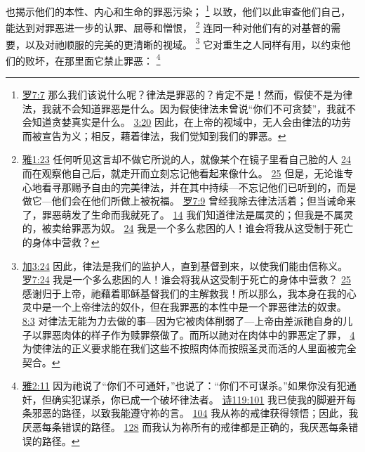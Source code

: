 \documentclass[12pt, a4paper, oneside]{ctexart}
\begin{document}
	也揭示他们的本性、内心和生命的罪恶污染；
	\footnote {
		\href{https://biblehub.com/romans/7-7.htm}{罗7:7} 那么我们该说什么呢？律法是罪恶的？肯定不是！然而，假使不是为律法，我就不会知道罪恶是什么。因为假使律法未曾说“你们不可贪婪”，我就不会知道贪婪真实是什么。
		\href{https://biblehub.com/romans/3-20.htm}{3:20} 因此，在上帝的视域中，无人会由律法的功劳而被宣告为义；相反，藉着律法，我们觉知到我们的罪恶。
	}
	以致，他们以此审查他们自己，能达到对罪恶进一步的认罪、屈辱和憎恨，
	\footnote {
		\href{https://biblehub.com/james/1-23.htm}{雅1:23} 任何听见这言却不做它所说的人，就像某个在镜子里看自己脸的人
		\href{https://biblehub.com/james/1-24.htm}{24} 而在观察他自己后，就走开而立刻忘记他看起来像什么。
		\href{https://biblehub.com/james/1-25.htm}{25} 但是，无论谁专心地看寻那赐予自由的完美律法，并在其中持续---不忘记他们已听到的，而是做它---他们会在他们所做上被祝福。
		\href{https://biblehub.com/romans/7-9.htm}{罗7:9} 曾经我除去律法活着；但当诫命来了，罪恶萌发了生命而我就死了。
		\href{https://biblehub.com/romans/7-14.htm}{14} 我们知道律法是属灵的；但我是不属灵的，被卖给罪恶为奴。
		\href{https://biblehub.com/romans/7-24.htm}{24} 我是一个多么悲困的人！谁会将我从这受制于死亡的身体中营救？
	}
	连同一种对他们有的对基督的需要，以及对祂顺服的完美的更清晰的视域。
	\footnote {
		\href{https://biblehub.com/galatians/3-24.htm}{加3:24} 因此，律法是我们的监护人，直到基督到来，以使我们能由信称义。
		\href{https://biblehub.com/romans/7-24.htm}{罗7:24} 我是一个多么悲困的人！谁会将我从这受制于死亡的身体中营救？
		\href{https://biblehub.com/romans/7-25.htm}{25} 感谢归于上帝，祂藉着耶稣基督我们的主解救我！所以那么，我本身在我的心灵中是一个上帝律法的奴仆，但在我罪恶的本性中是一个罪恶律法的奴隶。
		\href{https://biblehub.com/romans/8-3.htm}{8:3} 对律法无能为力去做的事---因为它被肉体削弱了---上帝由差派祂自身的儿子以罪恶肉体的样子作为赎罪祭做了。而所以祂对在肉体中的罪恶定了罪，
		\href{https://biblehub.com/romans/8-4.htm}{4} 为使律法的正义要求能在我们这些不按照肉体而按照圣灵而活的人里面被完全契合。
	}
	它对重生之人同样有用，以约束他们的败坏，在那里面它禁止罪恶：
	\footnote {
		\href{https://biblehub.com/james/2-11.htm}{雅2:11} 因为祂说了“你们不可通奸，”也说了：“你们不可谋杀。”如果你没有犯通奸，但确实犯谋杀，你已成一个破坏律法者。
		\href{https://biblehub.com/psalms/119-101.htm}{诗119:101} 我已使我的脚避开每条邪恶的路径，以致我能遵守祢的言。
		\href{https://biblehub.com/psalms/119-104.htm}{104} 我从祢的戒律获得领悟；因此，我厌恶每条错误的路径。
		\href{https://biblehub.com/psalms/119-128.htm}{128} 而我认为祢所有的戒律都是正确的，我厌恶每条错误的路径。
	}
\end{document}
